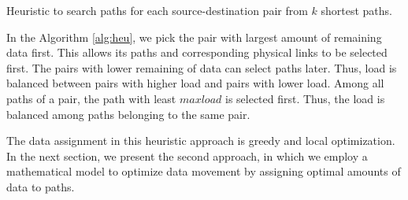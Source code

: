 \begin{algorithm}%
\SetAlgoLined\DontPrintSemicolon
{}

\caption{Heuristic to search paths for each source-destination pair from $k$ shortest paths.}
\label{alg:heu}
\end{algorithm}

In the Algorithm \ref{alg:heu}, we pick the pair with largest amount of remaining data first. This allows its paths and corresponding physical links to be selected first. The pairs with lower remaining of data can select paths later.  Thus, load is balanced between pairs with higher load and pairs with lower load. Among all paths of a pair, the path with least $maxload$ is selected first. Thus, the load is balanced among paths belonging to the same pair.

The data assignment in this heuristic approach is greedy and local optimization. In the next section, we present the second approach, in which we employ a mathematical model to optimize data movement by assigning optimal amounts of data to paths.
